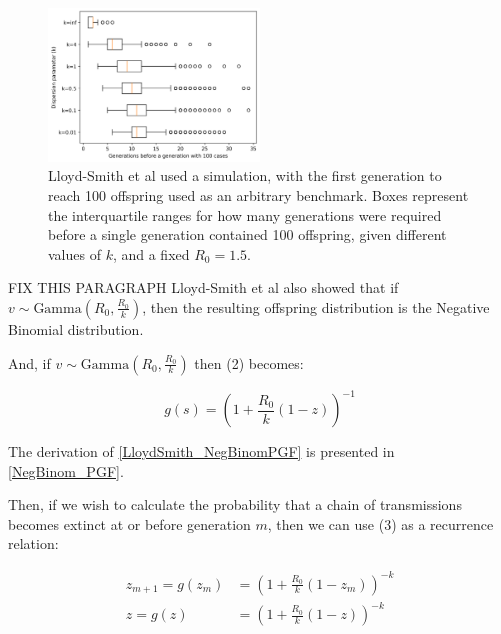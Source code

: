 \documentclass{article}
\begin{document}
\begin{figure}[h!]
    \includegraphics[width=0.5\textwidth, center]{2c_firstGenerationReach100Offspring.png}
    \caption{Lloyd-Smith et al used a simulation, with the first generation to reach 100 offspring used as an arbitrary benchmark. Boxes represent the interquartile ranges for how many generations were required before a single generation contained 100 offspring, given different values of $ k $, and a fixed $ R_0=1.5 $. }\label{fig:firstGenerationToReach100Offspring}
\end{figure}

FIX THIS PARAGRAPH
Lloyd-Smith et al also showed that if $ v \sim \text{Gamma}(R_0, \frac{R_0}{k}) $, then the resulting offspring distribution is the Negative Binomial distribution. 



And, if $ v \sim \text{Gamma}(R_0, \frac{R_0}{k}) $ then (2) becomes:

\begin{equation} \label{LloydSmith_NegBinomPGF}
    g(s) = \left( 1 + \frac{R_0}{k}(1-z) \right)^{-1}
\end{equation}

The derivation of \eqref{LloydSmith_NegBinomPGF} is presented in \eqref{NegBinom_PGF}.

Then, if we wish to calculate the probability that a chain of transmissions becomes extinct at or before generation $ m $, then we can use (3) as a recurrence relation:

\begin{align}
    z_{m+1} = g(z_{m}) &= \left( 1 + \frac{R_0}{k}(1-z_{m}) \right)^{-k} \label{LloydSmith_NegBinomPGF_Recurrence1}\\
    z = g(z) &= \left( 1 + \frac{R_0}{k}(1-z) \right)^{-k} \label{LloydSmith_NegBinomPGF_Recurrence2}
\end{align}
\end{document}
